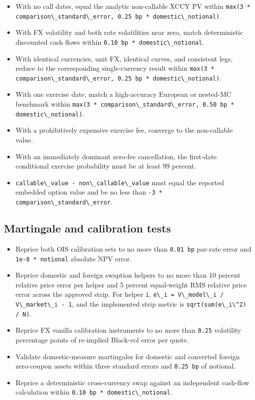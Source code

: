 \documentclass[conference]{IEEEtran}
\newcommand{\passthrough}[1]{#1}
\providecommand{\tightlist}{}
\begin{document}
\begin{itemize}
\tightlist
\item
  With no call dates, equal the analytic non-callable XCCY PV within
  \passthrough{\lstinline!max(3 * comparison\_standard\_error, 0.25 bp * domestic\_notional)!}.
\item
  With FX volatility and both rate volatilities near zero, match
  deterministic discounted cash flows within
  \passthrough{\lstinline!0.10 bp * domestic\_notional!}.
\item
  With identical currencies, unit FX, identical curves, and consistent
  legs, reduce to the corresponding single-currency result within
  \passthrough{\lstinline!max(3 * comparison\_standard\_error, 0.25 bp * domestic\_notional)!}.
\item
  With one exercise date, match a high-accuracy European or nested-MC
  benchmark within
  \passthrough{\lstinline!max(3 * comparison\_standard\_error, 0.50 bp * domestic\_notional)!}.
\item
  With a prohibitively expensive exercise fee, converge to the
  non-callable value.
\item
  With an immediately dominant zero-fee cancellation, the first-date
  conditional exercise probability must be at least 99 percent.
\item
  \passthrough{\lstinline!callable\_value - non\_callable\_value!} must
  equal the reported embedded option value and be no less than
  \passthrough{\lstinline!-3 * comparison\_standard\_error!}.
\end{itemize}

\subsection{Martingale and calibration
tests}\label{112-martingale-and-calibration-tests}

\begin{itemize}
\tightlist
\item
  Reprice both OIS calibration sets to no more than
  \passthrough{\lstinline!0.01 bp!} par-rate error and
  \passthrough{\lstinline!1e-8 * notional!} absolute NPV error.
\item
  Reprice domestic and foreign swaption helpers to no more than 10
  percent relative price error per helper and 5 percent equal-weight RMS
  relative price error across the approved strip. For helper
  \passthrough{\lstinline!i!},
  \passthrough{\lstinline!e\_i = V\_model\_i / V\_market\_i - 1!}, and
  the implemented strip metric is
  \passthrough{\lstinline!sqrt(sum(e\_i\^2) / N)!}.
\item
  Reprice FX vanilla calibration instruments to no more than
  \passthrough{\lstinline!0.25!} volatility percentage points of
  re-implied Black-vol error per quote.
\item
  Validate domestic-measure martingales for domestic and converted
  foreign zero-coupon assets within three standard errors and
  \passthrough{\lstinline!0.25 bp!} of notional.
\item
  Reprice a deterministic cross-currency swap against an independent
  cash-flow calculation within
  \passthrough{\lstinline!0.10 bp * domestic\_notional!}.
\end{itemize}
\end{document}
